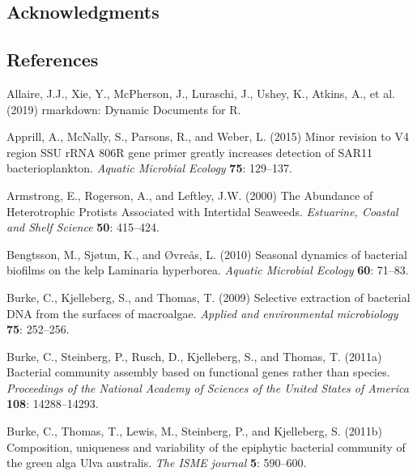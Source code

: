 \documentclass[12pt,]{article}
\begin{document}
\hypertarget{acknowledgments}{%
\subsection{Acknowledgments}\label{acknowledgments}}

\newpage

\hypertarget{references}{%
\subsection{References}\label{references}}

\hypertarget{refs}{}
\leavevmode\hypertarget{ref-Allaire2019}{}%
Allaire, J.J., Xie, Y., McPherson, J., Luraschi, J., Ushey, K., Atkins,
A., et al. (2019) rmarkdown: Dynamic Documents for R.

\leavevmode\hypertarget{ref-Apprill2015}{}%
Apprill, A., McNally, S., Parsons, R., and Weber, L. (2015) Minor
revision to V4 region SSU rRNA 806R gene primer greatly increases
detection of SAR11 bacterioplankton. \emph{Aquatic Microbial Ecology}
\textbf{75}: 129--137.

\leavevmode\hypertarget{ref-Armstrong2000}{}%
Armstrong, E., Rogerson, A., and Leftley, J.W. (2000) The Abundance of
Heterotrophic Protists Associated with Intertidal Seaweeds.
\emph{Estuarine, Coastal and Shelf Science} \textbf{50}: 415--424.

\leavevmode\hypertarget{ref-Bengtsson2010}{}%
Bengtsson, M., Sjøtun, K., and Øvreås, L. (2010) Seasonal dynamics of
bacterial biofilms on the kelp Laminaria hyperborea. \emph{Aquatic
Microbial Ecology} \textbf{60}: 71--83.

\leavevmode\hypertarget{ref-Burke2009}{}%
Burke, C., Kjelleberg, S., and Thomas, T. (2009) Selective extraction of
bacterial DNA from the surfaces of macroalgae. \emph{Applied and
environmental microbiology} \textbf{75}: 252--256.

\leavevmode\hypertarget{ref-Burke2011a}{}%
Burke, C., Steinberg, P., Rusch, D., Kjelleberg, S., and Thomas, T.
(2011a) Bacterial community assembly based on functional genes rather
than species. \emph{Proceedings of the National Academy of Sciences of
the United States of America} \textbf{108}: 14288--14293.

\leavevmode\hypertarget{ref-Burke2011b}{}%
Burke, C., Thomas, T., Lewis, M., Steinberg, P., and Kjelleberg, S.
(2011b) Composition, uniqueness and variability of the epiphytic
bacterial community of the green alga Ulva australis. \emph{The ISME
journal} \textbf{5}: 590--600.
\end{document}
